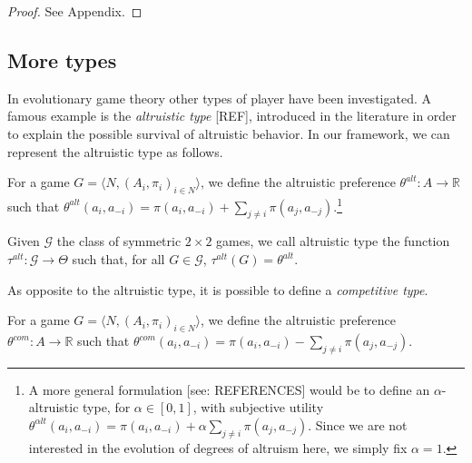 \documentclass[fleqn,reqno,11pt]{article}
\begin{document}
\begin{proof}
See Appendix.
\end{proof}





\subsection{More types}

In evolutionary game theory other types of player have been investigated. A famous example is the \textit{altruistic type} [REF], introduced in the literature in order to explain the possible survival of altruistic behavior. In our framework, we can represent the altruistic type as follows. 

\begin{definition} \label{defn:altpref}

For a game $ G=\langle N, (A_i , \pi_i)_{i \in N} \rangle $, we define the altruistic preference $ \theta^{alt}: A \rightarrow \mathbb{R} $ such that $ \theta^{alt}(a_i,a_{-i})=\pi(a_i,a_{-i}) + \sum_{j \neq i} \pi(a_{j},a_{-j})$.\footnote{A more general formulation [see: REFERENCES] would be to define an $ \alpha$-altruistic type, for $\alpha \in [0,1]$, with subjective utility $ \theta^{\alpha lt}(a_i,a_{-i})=\pi(a_i,a_{-i}) + \alpha \sum_{j \neq i} \pi(a_{j},a_{-j})$. Since we are not interested in the evolution of degrees of altruism here, we simply fix $ \alpha = 1 $.}

\end{definition}

\begin{definition} \label{defn:alttype}

Given $ \mathcal{G} $ the class of symmetric $ 2 \times 2 $ games, we call altruistic type the function $\tau^{alt}: \mathcal{G} \rightarrow  \Theta$ such that, for all $G \in \mathcal{G}$, $ \tau^{alt}(G)= \theta^{alt}$.

\end{definition}

\noindent As opposite to the altruistic type, it is possible to define a \textit{competitive type}. 

\begin{definition} \label{defn:compref}

For a game $ G=\langle N, (A_i , \pi_i)_{i \in N} \rangle $, we define the altruistic preference $ \theta^{com}: A \rightarrow \mathbb{R} $ such that $ \theta^{com}(a_i,a_{-i})=\pi(a_i,a_{-i}) - \sum_{j \neq i} \pi(a_{j},a_{-j})$.

\end{definition}
\end{document}
